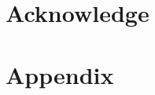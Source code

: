 \documentclass[12pt]{article}
\theoremstyle{plain}
\begin{document}
\section{Acknowledge}





\section{Appendix}





\newpage
\medskip


\end{document}
